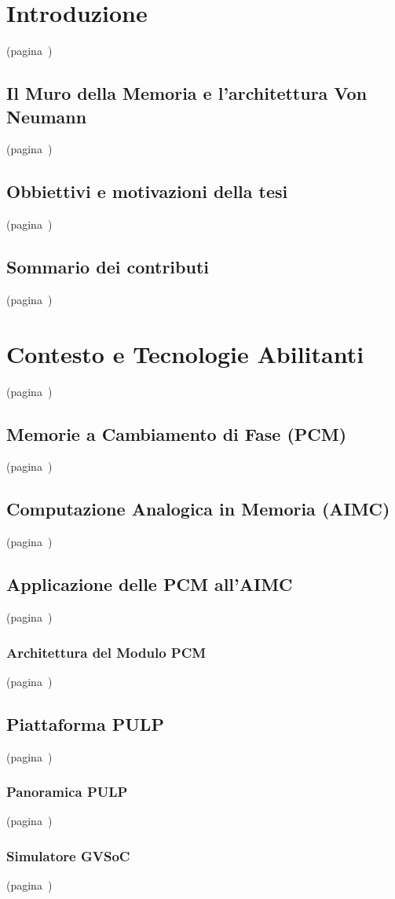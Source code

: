 \chapter{Introduzione} (pagina~\pageref{chap:intro})
\section{Il Muro della Memoria e l'architettura Von Neumann}(pagina~\pageref{sec:memwall})
\section{Obbiettivi e motivazioni della tesi}(pagina~\pageref{sec:obj})
\section{Sommario dei contributi}(pagina~\pageref{sec:contri})


\chapter{Contesto e Tecnologie Abilitanti} (pagina~\pageref{chap:background})
\section{Memorie a Cambiamento di Fase (PCM)}(pagina~\pageref{sec:pcm})
\section{Computazione Analogica in Memoria (AIMC)}(pagina~\pageref{sec:aimc})
\section{Applicazione delle PCM all'AIMC}(pagina~\pageref{sec:aimc_pcm})
\subsection{Architettura del Modulo PCM}(pagina~\pageref{sec:PCM_Module_arch})
\section{Piattaforma PULP }(pagina~\pageref{sec:pulp})
\subsection{Panoramica PULP}(pagina~\pageref{sec:pulp_ov})
\subsection{Simulatore GVSoC}(pagina~\pageref{sec:gvsoc})


